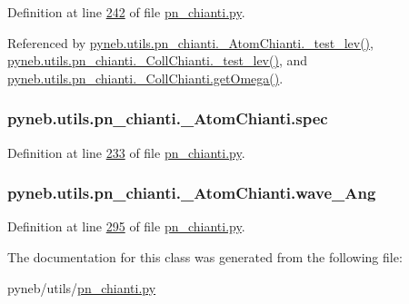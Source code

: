 Definition at line \hyperlink{pn__chianti_8py_source_l00242}{242} of file \hyperlink{pn__chianti_8py_source}{pn\-\_\-chianti.\-py}.



Referenced by \hyperlink{pn__chianti_8py_source_l00304}{pyneb.\-utils.\-pn\-\_\-chianti.\-\_\-\-Atom\-Chianti.\-\_\-test\-\_\-lev()}, \hyperlink{pn__chianti_8py_source_l00472}{pyneb.\-utils.\-pn\-\_\-chianti.\-\_\-\-Coll\-Chianti.\-\_\-test\-\_\-lev()}, and \hyperlink{pn__chianti_8py_source_l00507}{pyneb.\-utils.\-pn\-\_\-chianti.\-\_\-\-Coll\-Chianti.\-get\-Omega()}.

\hypertarget{classpyneb_1_1utils_1_1pn__chianti_1_1___atom_chianti_a12c7570333087fefa72763dd77a81379}{
\subsubsection[{spec}]{\setlength{\rightskip}{0pt plus 5cm}pyneb.\-utils.\-pn\-\_\-chianti.\-\_\-\-Atom\-Chianti.\-spec}}\label{classpyneb_1_1utils_1_1pn__chianti_1_1___atom_chianti_a12c7570333087fefa72763dd77a81379}


Definition at line \hyperlink{pn__chianti_8py_source_l00233}{233} of file \hyperlink{pn__chianti_8py_source}{pn\-\_\-chianti.\-py}.

\hypertarget{classpyneb_1_1utils_1_1pn__chianti_1_1___atom_chianti_aca46b2e32f9bc1412824ea3998fbe97f}{
\subsubsection[{wave\-\_\-\-Ang}]{\setlength{\rightskip}{0pt plus 5cm}pyneb.\-utils.\-pn\-\_\-chianti.\-\_\-\-Atom\-Chianti.\-wave\-\_\-\-Ang}}\label{classpyneb_1_1utils_1_1pn__chianti_1_1___atom_chianti_aca46b2e32f9bc1412824ea3998fbe97f}


Definition at line \hyperlink{pn__chianti_8py_source_l00295}{295} of file \hyperlink{pn__chianti_8py_source}{pn\-\_\-chianti.\-py}.



The documentation for this class was generated from the following file\-:\begin{DoxyCompactItemize}
\item 
pyneb/utils/\hyperlink{pn__chianti_8py}{pn\-\_\-chianti.\-py}\end{DoxyCompactItemize}
